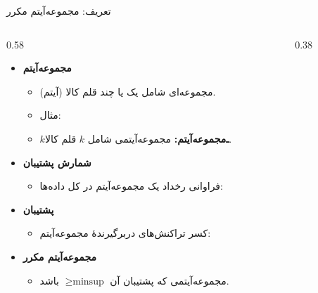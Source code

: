 \begin{frame}{تعریف: مجموعه‌آیتم مکرر}{}
\begin{columns}[T,onlytextwidth]
\begin{column}{0.58\textwidth}
\begin{itemize}\setlength{\itemsep}{3pt}\small
    \item \textbf{مجموعه‌آیتم} 
    \begin{itemize}\footnotesize
        \item مجموعه‌ای شامل یک یا چند قلم کالا (آیتم).
        \item مثال: 
        \item \textbf{$k$‌ـ‌مجموعه‌آیتم:} مجموعه‌آیتمی شامل $k$ قلم کالا.
    \end{itemize}
    \item \textbf{شمارش پشتیبان} 
    \begin{itemize}\footnotesize
        \item فراوانی رخداد یک مجموعه‌آیتم در کل داده‌ها:
        \par\vspace{1pt}\noindent{}\par\vspace{1pt}
    \end{itemize}
    \item \textbf{پشتیبان} 
    \begin{itemize}\footnotesize
        \item کسر تراکنش‌های دربرگیرندهٔ مجموعه‌آیتم:
        \par\vspace{1pt}\noindent{}\par\vspace{1pt}
    \end{itemize}
    \item \textbf{مجموعه‌آیتم مکرر} 
    \begin{itemize}\footnotesize
        \item مجموعه‌آیتمی که پشتیبان آن $\ge \text{minsup}$ باشد.
    \end{itemize}
\end{itemize}
\end{column}%
\begin{column}{0.38\textwidth}

\end{column}
\end{columns}
\end{frame}
